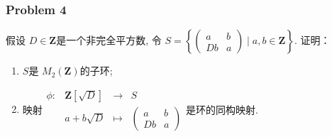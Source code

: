 \documentclass[a4paper,12pt]{ctexart}
\newcommand{\Z}{\mathbf{Z}}
\begin{document}
\subsubsection*{Problem 4}
    假设 $ D\in\Z $是一个非完全平方数, 
    令 $ S=\left\{\begin{pmatrix}a &b\\Db &a\end{pmatrix}\mid a,b\in \Z\right\} $. 证明：
    \begin{enumerate}
      \item $ S $是 $ M_2(\Z) $的子环;
      \item 映射$ \begin{array}{rccc}
        \phi:&\Z[\sqrt{D}]&\rightarrow&S\\
        &a+b\sqrt{D}&\mapsto&\begin{pmatrix}a &b\\Db &a\end{pmatrix}
      \end{array} $是环的同构映射.
    \end{enumerate}
\end{document}
